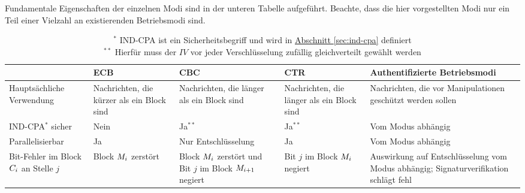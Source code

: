 Fundamentale Eigenschaften der einzelnen Modi sind in der unteren
Tabelle aufgeführt. Beachte, dass die hier vorgestellten Modi nur ein
Teil einer Vielzahl an existierenden Betriebsmodi sind. \indexECB
\indexCBC \indexCTR {} 
\begin{table}[h]
  \captionsetup{labelformat=empty}
  \captionsetup{singlelinecheck=false}
  \captionsetup{font=footnotesize}
  \centering
  \begin{tabularx}{\textwidth}{ | >{\raggedright\arraybackslash}X | >{\raggedright\arraybackslash}X | >{\raggedright\arraybackslash}X | >{\raggedright\arraybackslash}X | >{\raggedright\arraybackslash}X |} 
    \hline
    & ECB & CBC & CTR & Authentifizierte Betriebsmodi\\ 
    \hline
    Hauptsächliche Verwendung & Nachrichten, die kürzer als ein Block sind & Nachrichten, die länger als ein Block sind
    & Nachrichten, die länger als ein Block sind & Nachrichten, die vor Manipulationen geschützt werden sollen\\ 
    \hline
    \parbox{3cm}{IND-CPA\(^{\ast}\) } sicher & Nein & Ja$^{\ast\ast}$ & Ja$^{\ast\ast}$ & Vom Modus abhängig\\
    \hline
    Parallelisierbar & Ja & Nur Entschlüsselung & Ja & Vom Modus abhängig\\ 
    \hline
    Bit-Fehler im Block $C_i$ an Stelle $j$ & Block $M_i$ zerstört & Block $M_i$ zerstört und Bit $j$ im Block $M_{i+1}$ negiert 
    & Bit $j$ im Block $M_i$ negiert & Auswirkung auf Entschlüsselung vom Modus abhängig; Signaturverifikation schlägt fehl\\
    \hline
  \end{tabularx}
  \caption{$^{\ast}$ IND-CPA ist ein Sicherheitsbegriff und wird in
    \hyperref[sec:ind-cpa]{Abschnitt \ref{sec:ind-cpa}} definiert\\  
    $^{\ast\ast}$ Hierfür muss der $IV$ vor jeder Verschlüsselung
    zufällig gleichverteilt gewählt werden} 
\end{table}

